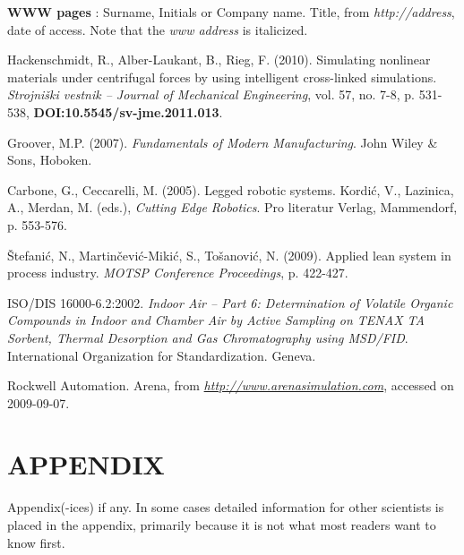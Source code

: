 \documentclass[10pt]{JoME}
\begin{document}
\textrm{\textbf{WWW pages} \cite{bib6}: 
Surname, Initials or Company name. Title, from \textit{http://address}, date of access. Note that the \textit{www address} is italicized.}
 
\vspace*{-15pt}
\begin{thebibliography}{9} 

 Hackenschmidt, R., Alber-Laukant, B., Rieg, F. (2010). Simulating nonlinear materials under centrifugal forces by using intelligent cross-linked simulations. \textit{Strojniški vestnik -- Journal of Mechanical Engineering}, vol. 57, no. 7-8, p. 531-538, \textbf{DOI:10.5545/sv-jme.2011.013}.

 Groover, M.P. (2007). \textit{Fundamentals of Modern Manufacturing}. John Wiley \& Sons, Hoboken.

 Carbone, G., Ceccarelli, M. (2005). Legged robotic systems. Kordić, V., Lazinica, A., Merdan, M. (eds.), \textit{Cutting Edge Robotics}. Pro literatur Verlag, Mammendorf, p. 553-576.

 Štefanić, N., Martinčević-Mikić, S., Tošanović, N. (2009). Applied lean system in process industry. \textit{MOTSP Conference Proceedings}, p. 422-427.

 ISO/DIS 16000-6.2:2002. \textit{Indoor Air – Part 6: Determination of Volatile Organic Compounds in Indoor and Chamber Air by Active Sampling on TENAX TA Sorbent, Thermal Desorption and Gas Chromatography using MSD/FID}. International Organization for Standardization. Geneva.

 Rockwell Automation. Arena, from \href{http://www.arenasimulation.com}{\textit{http://www.arenasimulation.com}}, accessed on 2009-09-07.

\end{thebibliography}
\section{APPENDIX}

Appendix(-ices) if any. In some cases detailed information for other scientists is placed in the appendix, primarily because it is not what most readers want to know first.

 
\end{document}
